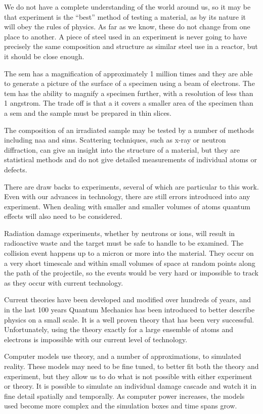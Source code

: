 We do not have a complete understanding of the world around us, so it may be that experiment is the \enquote{best} method of testing a material, as by its nature it will obey the rules of physics.  As far as we know, these do not change from one place to another.  A piece of steel used in an experiment is never going to have precisely the same composition and structure as similar steel use in a reactor, but it should be close enough.

The \acrlong{sem} has a magnification of approximately 1 million times and they are able to generate a picture of the surface of a specimen using a beam of electrons.  The \acrlong{tem} has the ability to magnify a specimen further, with a resolution of less than 1 angstrom.  The trade off is that a it covers a smaller area of the specimen than a \acrshort{sem} and the sample must be prepared in thin slices.

The composition of an irradiated sample may be tested by a number of methods including \acrlong{naa} and \acrlong{sims}.  Scattering techniques, such as x-ray or neutron diffraction, can give an insight into the structure of a material, but they are statistical methods and do not give detailed measurements of individual atoms or defects.

There are draw backs to experiments, several of which are particular to this work.  Even with our advances in technology, there are still errors introduced into any experiment.  When dealing with smaller and smaller volumes of atoms quantum effects will also need to be considered.

Radiation damage experiments, whether by neutrons or ions, will result in radioactive waste and the target must be safe to handle to be examined.  The collision event happens up to a micron or more into the material.  They occur on a very short timescale and within small volumes of space at random points along the path of the projectile, so the events would be very hard or impossible to track as they occur with current technology.

Current theories have been developed and modified over hundreds of years, and in the last 100 years Quantum Mechanics has been introduced to better describe physics on a small scale.  It is a well proven theory that has been very successful.  Unfortunately, using the theory exactly for a large ensemble of atoms and electrons is impossible with our current level of technology.

Computer models use theory, and a number of approximations, to simulated reality.  These models may need to be fine tuned, to better fit both the theory and experiment, but they allow us to do what is not possible with either experiment or theory.  It is possible to simulate an individual damage cascade and watch it in fine detail spatially and temporally.  As computer power increases, the models used become more complex and the simulation boxes and time spans grow.

